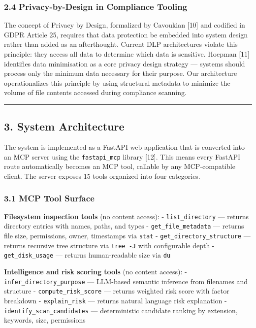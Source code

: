\documentclass[
]{article}
\begin{document}
\subsubsection{2.4 Privacy-by-Design in Compliance
Tooling}\label{privacy-by-design-in-compliance-tooling}

The concept of Privacy by Design, formalized by Cavoukian {[}10{]} and
codified in GDPR Article 25, requires that data protection be embedded
into system design rather than added as an afterthought. Current DLP
architectures violate this principle: they access all data to determine
which data is sensitive. Hoepman {[}11{]} identifies data minimisation
as a core privacy design strategy --- systems should process only the
minimum data necessary for their purpose. Our architecture
operationalizes this principle by using structural metadata to minimize
the volume of file contents accessed during compliance scanning.

\begin{center}\rule{0.5\linewidth}{0.5pt}\end{center}

\subsection{3. System Architecture}\label{system-architecture}

The system is implemented as a FastAPI web application that is converted
into an MCP server using the \texttt{fastapi\_mcp} library {[}12{]}.
This means every FastAPI route automatically becomes an MCP tool,
callable by any MCP-compatible client. The server exposes 15 tools
organized into four categories.

\subsubsection{3.1 MCP Tool Surface}\label{mcp-tool-surface}

\textbf{Filesystem inspection tools} (no content access): -
\texttt{list\_directory} --- returns directory entries with names,
paths, and types - \texttt{get\_file\_metadata} --- returns file size,
permissions, owner, timestamps via \texttt{stat} -
\texttt{get\_directory\_structure} --- returns recursive tree structure
via \texttt{tree\ -J} with configurable depth -
\texttt{get\_disk\_usage} --- returns human-readable size via
\texttt{du}

\textbf{Intelligence and risk scoring tools} (no content access): -
\texttt{infer\_directory\_purpose} --- LLM-based semantic inference from
filenames and structure - \texttt{compute\_risk\_score} --- returns
weighted risk score with factor breakdown - \texttt{explain\_risk} ---
returns natural language risk explanation -
\texttt{identify\_scan\_candidates} --- deterministic candidate ranking
by extension, keywords, size, permissions
\end{document}
